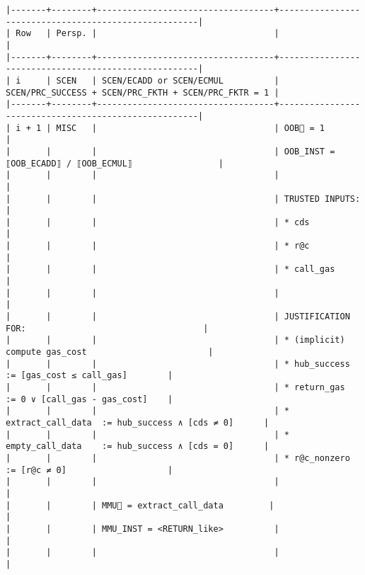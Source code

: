 \documentclass[varwidth=\maxdimen,margin=0.5cm,multi={verbatim}]{standalone}
\begin{document}
\begin{verbatim}
|-------+--------+-----------------------------------+------------------------------------------------------|
| Row   | Persp. |                                   |                                                      |
|-------+--------+-----------------------------------+------------------------------------------------------|
| i     | SCEN   | SCEN/ECADD or SCEN/ECMUL          | SCEN/PRC_SUCCESS + SCEN/PRC_FKTH + SCEN/PRC_FKTR = 1 |
|-------+--------+-----------------------------------+------------------------------------------------------|
| i + 1 | MISC   |                                   | OOB🏴 = 1                                            |
|       |        |                                   | OOB_INST = ⟦OOB_ECADD⟧ / ⟦OOB_ECMUL⟧                 |
|       |        |                                   |                                                      |
|       |        |                                   | TRUSTED INPUTS:                                      |
|       |        |                                   | * cds                                                |
|       |        |                                   | * r@c                                                |
|       |        |                                   | * call_gas                                           |
|       |        |                                   |                                                      |
|       |        |                                   | JUSTIFICATION FOR:                                   |
|       |        |                                   | * (implicit) compute gas_cost                        |
|       |        |                                   | * hub_success        := [gas_cost ≤ call_gas]        |
|       |        |                                   | * return_gas         := 0 ∨ [call_gas - gas_cost]    |
|       |        |                                   | * extract_call_data  := hub_success ∧ [cds ≠ 0]      |
|       |        |                                   | * empty_call_data    := hub_success ∧ [cds = 0]      |
|       |        |                                   | * r@c_nonzero        := [r@c ≠ 0]                    |
|       |        |                                   |                                                      |
|       |        | MMU🏴 = extract_call_data         |                                                      |
|       |        | MMU_INST = <RETURN_like>          |                                                      |
|       |        |                                   |                                                      |

\end{verbatim}
\end{document}
